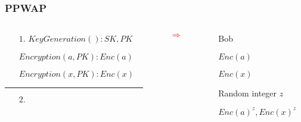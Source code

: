 \documentclass[xcolor=table]{beamer}
\newcommand{\red}[1]{\textcolor{red}{#1}}
\begin{document}
\begin{frame}
\frametitle{PPWAP}
\begin{columns}

\begin{column}{6cm}
\begin{itemize} \itemsep1pt \parskip0pt 
  \item[] \hspace{16mm}{Alice} \newline
  \item[$1.$] $KeyGeneration(): SK, PK$
  \item[] $Encryption(a ,PK): Enc(a)$
  \item[] $Encryption(x ,PK): Enc(x)$
\end{itemize}
\noindent\rule{12cm}{0.4pt}
\begin{itemize} \itemsep1pt \parskip0pt 
  \item[$2.$] 
\end{itemize}
\end{column}
\begin{column}{1cm}
\begin{itemize} \itemsep1pt \parskip0pt 
  \item[] \red{\Huge $\Rightarrow $}
\end{itemize}
\vspace{1 cm}
\end{column}
\begin{column}{4cm}
\begin{itemize} \itemsep1pt \parskip0pt 
  \item[] 
  \item[] Bob
  \item[] 
  \item[] $Enc(a)$
  \item[] $Enc(x)$
\end{itemize}
\vspace{6mm}
\begin{itemize} \itemsep1pt \parskip0pt 
  \item[] 
  \item[] Random integer $z$
  \item[] $Enc(a)^z, Enc(x)^z$
\end{itemize}
\end{column}
\end{columns}

\end{frame}
\end{document}
